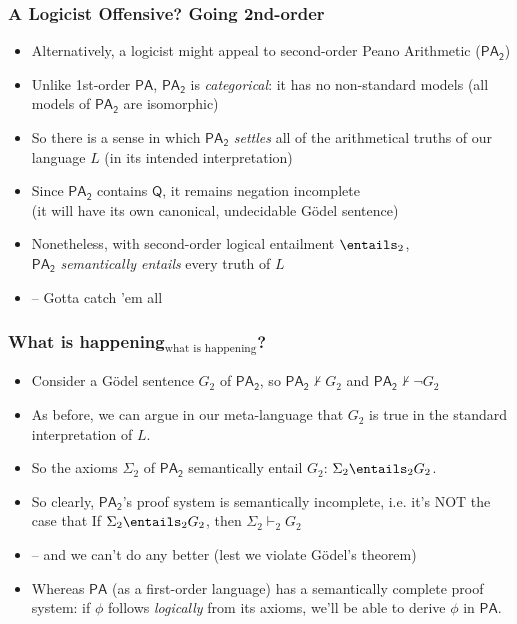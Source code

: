 \begin{frame}
\frametitle{A Logicist Offensive? Going 2nd-order}

\begin{itemize}[<+->]

\item Alternatively, a logicist might appeal to second-order Peano Arithmetic ($\mathsf{PA_2} $)

\item Unlike 1st-order $\mathsf{PA} $, $\mathsf{PA_2} $ is \textit{categorical}: it has no non-standard models (all models of $\mathsf{PA_2} $ are isomorphic)

\item So there is a sense in which $\mathsf{PA_2} $ \textit{settles} all of the arithmetical truths of our language $L$ (in its intended interpretation)

\item Since $\mathsf{PA_2} $ contains $\mathsf{Q} $, it remains negation incomplete \\ (it will have its own canonical, undecidable G\"odel sentence)

\item Nonetheless, with second-order logical entailment $\entails_2$, \\ $\mathsf{PA_2} $ \textit{semantically entails} every truth of $L$
\item[] -- Gotta catch 'em all 

\end{itemize}
\end{frame}

\begin{frame}
\frametitle{What is happening$_{\text{what is happening}}$?}

\begin{itemize}[<+->]

\item Consider a G\"odel sentence $G_2$ of $\mathsf{PA_2} $, so $\mathsf{PA_2} \nvdash G_2$ and $\mathsf{PA_2} \nvdash \neg G_2$ 
\item[] As before, we can argue in our meta-language that $G_2$ is true in the standard interpretation of $L$. 

\item So the axioms $\Sigma_2$ of $\mathsf{PA_2}$ semantically entail $G_2$: $\Sigma_2 \entails_2 G_2$.

\item So clearly, $\mathsf{PA_2}$'s proof system is semantically incomplete, i.e. it's NOT the case that If $\Sigma_2 \entails_2 G_2$, then $\Sigma_2 \vdash_2 G_2$
\item[] -- and we can't do any better (lest we violate G\"odel's theorem)
%

\item Whereas $\mathsf{PA}$ (as a first-order language) has a semantically complete proof system: if $\phi$ follows \textit{logically} from its axioms, we'll be able to derive $\phi$ in $\mathsf{PA}$. 

\end{itemize}
\end{frame}


